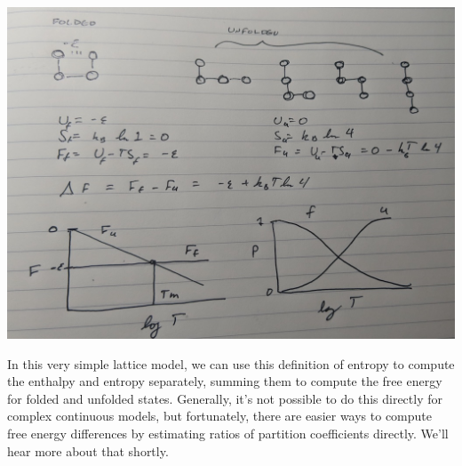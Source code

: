 \documentclass[english,course]{lecture}
\begin{document}
\begin{centering}
\includegraphics[width=1\textwidth]{figures/lattice-model-protein.jpg}

\end{centering}

In this very simple lattice model, we can use this definition of entropy to compute the enthalpy and entropy separately, summing them to compute the free energy for folded and unfolded states.
Generally, it's not possible to do this directly for complex continuous models, but fortunately, there are easier ways to compute free energy differences by estimating ratios of partition coefficients directly.
We'll hear more about that shortly.




\end{document}
